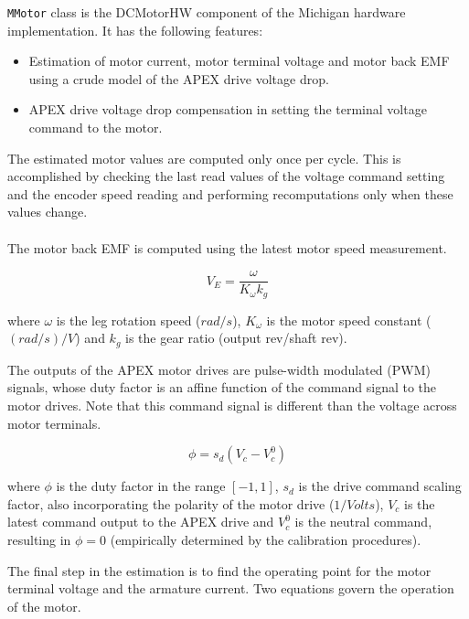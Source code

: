 {\tt MMotor} class is the DCMotorHW component of the Michigan hardware
implementation. It has the following features:

\begin{itemize}
\item{Estimation of motor current, motor terminal voltage and motor back EMF
using a crude model of the APEX drive voltage drop.}

\item{APEX drive voltage drop compensation in setting the terminal voltage
command to the motor.}

\end{itemize}

The estimated motor values are computed only once per cycle. This is
accomplished by checking the last read values of the voltage command setting
and the encoder speed reading and performing recomputations only when these
values change.\\

\\

The motor back EMF is computed using the latest motor speed measurement.

\begin{equation*}
V_E = \frac{\omega}{K_\omega k_g}
\end{equation*}

\noindent where $\omega$ is the leg rotation speed ($rad/s$), $K_\omega$ is
the motor speed constant ($(rad/s)/V$) and $k_g$ is the gear ratio (output
rev/shaft rev).

The outputs of the APEX motor drives are pulse-width modulated (PWM)
signals, whose duty factor is an affine function of the command signal to
the motor drives. Note that this command signal is different than the
voltage across motor terminals.

\begin{equation}
\phi = s_d (V_c - V_c^0)
\label{eq:affine_apex_command}
\end{equation}

\noindent where $\phi$ is the duty factor in the range $[-1, 1]$,
$s_d$ is the drive command scaling factor, also incorporating the polarity
of the motor drive ($1/Volts$), $V_c$ is the latest command output to the APEX
drive and $V_c^0$ is the neutral command, resulting in $\phi = 0$
(empirically determined by the calibration procedures).

The final step in the estimation is to find the operating point for the
motor terminal voltage and the armature current. Two equations govern the
operation of the motor.

